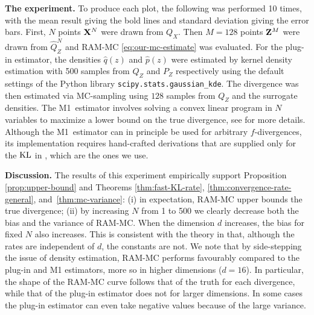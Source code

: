 \textbf{The experiment.}
To produce each plot, the following was performed 10 times, with the mean result giving the bold lines and standard deviation giving the error bars.
First, $N$ points $\mathbf{X}^N$ were drawn from $Q_X$. 
Then $M{=}128$ points $\mathbf{Z}^M$ were drawn from $\hat{Q}_Z^N$ and RAM-MC \eqref{eq:our-mc-estimate} was evaluated. 
For the plug-in estimator, the densities $\hat{q}(z)$ and $\hat{p}(z)$ were estimated by kernel density estimation with 500 samples from $Q_Z$ and $P_Z$ respectively using the default settings of the Python library {\texttt{scipy.stats.gaussian\_kde}}.
The divergence was then estimated via MC-sampling using $128$ samples from $Q_Z$ and the surrogate densities.
The M1~estimator involves solving a convex linear program in $N$ variables to maximize a lower bound on the true divergence, see \cite{nguyen10ratio} for more details.
Although the M1~estimator can in principle be used for arbitrary $f$-divergences, its implementation requires hand-crafted derivations that are supplied only for the $\mathrm{KL}$ in \cite{nguyen10ratio}, which are the ones we use.

\textbf{Discussion.}
The results of this experiment empirically support Proposition \ref{prop:upper-bound} and Theorems \ref{thm:fast-KL-rate}, \ref{thm:convergence-rate-general}, and~\ref{thm:mc-variance}:
(i) in expectation, RAM-MC upper bounds the true divergence; (ii) by increasing $N$ from 1 to 500 we clearly decrease both the bias and the variance of RAM-MC.
When the dimension $d$ increases, the bias for fixed $N$ also increases.
This is consistent with the theory in that, although the rates are independent of $d$, the constants are not.
We note that by side-stepping the issue of density estimation, RAM-MC performs favourably compared to the plug-in and M1 estimators, more so in higher dimensions ($d=16$).
In particular, the shape of the RAM-MC curve follows that of the truth for each divergence, while that of the plug-in estimator does not for larger dimensions.
In some cases the plug-in estimator can even take negative values because of the large variance.


